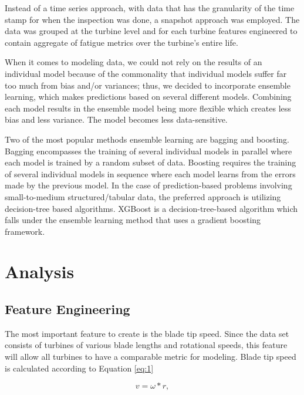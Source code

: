 \documentclass[runningheads]{llncs}
\begin{document}
Instead of a time series approach, with data that has the granularity of the time stamp for when the inspection was done, a snapshot approach was employed. The data was grouped at the turbine level and for each turbine features engineered to contain aggregate of fatigue metrics over the turbine's entire life. 

When it comes to modeling data, we could not rely on the results of an individual model because of the commonality that individual models suffer far too much from bias and/or variances; thus, we decided to incorporate ensemble learning, which makes predictions based on several different models. Combining each model results in the ensemble model being more flexible which creates less bias and less variance. The model becomes less data-sensitive\cite{ensemble}.

Two of the most popular methods ensemble learning are bagging and boosting. Bagging encompasses the training of several individual models in parallel where each model is trained by a random subset of data. Boosting requires the training of several individual models in sequence where each model learns from the errors made by the previous model\cite{ensemble}. In the case of prediction-based problems involving small-to-medium structured/tabular data, the preferred approach is utilizing decision-tree based algorithms\cite{XGBoost}. XGBoost is a decision-tree-based algorithm which falls under the ensemble learning method that uses a gradient boosting framework\cite{XGBoost}.

\section{Analysis} 

\subsection{Feature Engineering}

The most important feature to create is the blade tip speed. Since the data set consists of turbines of various blade lengths and rotational speeds, this feature will allow all turbines to have a comparable metric for modeling. Blade tip speed is calculated according to Equation \ref{eq:1}

\begin{equation} \label{eq:1}
  v = \omega*r,
\end{equation}
\end{document}
